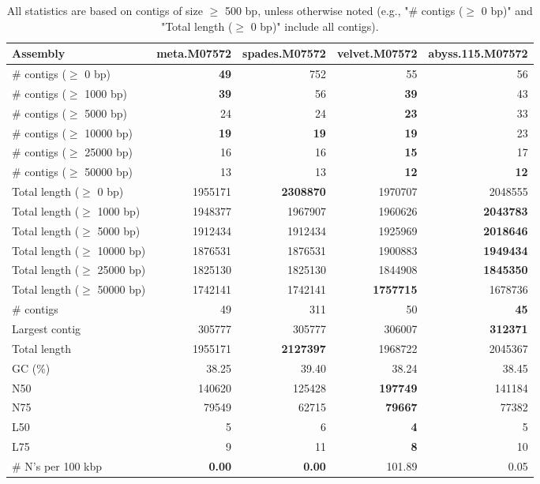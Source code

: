 \documentclass[12pt,a4paper]{article}
\begin{document}
\begin{table}[ht]
\begin{center}
\caption{All statistics are based on contigs of size $\geq$ 500 bp, unless otherwise noted (e.g., "\# contigs ($\geq$ 0 bp)" and "Total length ($\geq$ 0 bp)" include all contigs).}
\begin{tabular}{|l*{4}{|r}|}
\hline
Assembly & meta.M07572 & spades.M07572 & velvet.M07572 & abyss.115.M07572 \\ \hline
\# contigs ($\geq$ 0 bp) & {\bf 49} & 752 & 55 & 56 \\ \hline
\# contigs ($\geq$ 1000 bp) & {\bf 39} & 56 & {\bf 39} & 43 \\ \hline
\# contigs ($\geq$ 5000 bp) & 24 & 24 & {\bf 23} & 33 \\ \hline
\# contigs ($\geq$ 10000 bp) & {\bf 19} & {\bf 19} & {\bf 19} & 23 \\ \hline
\# contigs ($\geq$ 25000 bp) & 16 & 16 & {\bf 15} & 17 \\ \hline
\# contigs ($\geq$ 50000 bp) & 13 & 13 & {\bf 12} & {\bf 12} \\ \hline
Total length ($\geq$ 0 bp) & 1955171 & {\bf 2308870} & 1970707 & 2048555 \\ \hline
Total length ($\geq$ 1000 bp) & 1948377 & 1967907 & 1960626 & {\bf 2043783} \\ \hline
Total length ($\geq$ 5000 bp) & 1912434 & 1912434 & 1925969 & {\bf 2018646} \\ \hline
Total length ($\geq$ 10000 bp) & 1876531 & 1876531 & 1900883 & {\bf 1949434} \\ \hline
Total length ($\geq$ 25000 bp) & 1825130 & 1825130 & 1844908 & {\bf 1845350} \\ \hline
Total length ($\geq$ 50000 bp) & 1742141 & 1742141 & {\bf 1757715} & 1678736 \\ \hline
\# contigs & 49 & 311 & 50 & {\bf 45} \\ \hline
Largest contig & 305777 & 305777 & 306007 & {\bf 312371} \\ \hline
Total length & 1955171 & {\bf 2127397} & 1968722 & 2045367 \\ \hline
GC (\%) & 38.25 & 39.40 & 38.24 & 38.45 \\ \hline
N50 & 140620 & 125428 & {\bf 197749} & 141184 \\ \hline
N75 & 79549 & 62715 & {\bf 79667} & 77382 \\ \hline
L50 & 5 & 6 & {\bf 4} & 5 \\ \hline
L75 & 9 & 11 & {\bf 8} & 10 \\ \hline
\# N's per 100 kbp & {\bf 0.00} & {\bf 0.00} & 101.89 & 0.05 \\ \hline
\end{tabular}
\end{center}
\end{table}
\end{document}
